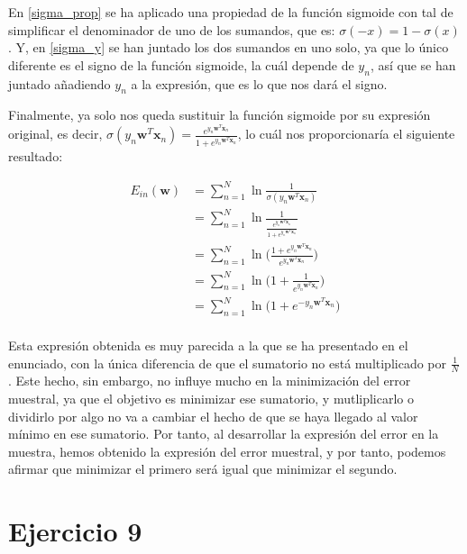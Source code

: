 \documentclass[11pt,a4paper]{article}
\begin{document}
En \eqref{sigma_prop} se ha aplicado una propiedad de la función sigmoide con tal de simplificar el denominador de uno de
los sumandos, que es: $\sigma (-x) = 1 - \sigma (x)$. Y, en \eqref{sigma_y} se han juntado los dos sumandos en uno solo, ya
que lo único diferente es el signo de la función sigmoide, la cuál depende de $y_n$, así que se han juntado añadiendo $y_n$
a la expresión, que es lo que nos dará el signo.

Finalmente, ya solo nos queda sustituir la función sigmoide por su expresión original, es decir,
$\sigma (y_n \mathbf{w}^T\mathbf{x}_n) = \frac{e^{y_n \mathbf{w}^T\mathbf{x}_n}}{1 + e^{y_n \mathbf{w}^T\mathbf{x}_n}}$, lo
cuál nos proporcionaría el siguiente resultado:

\begin{equation}
\begin{split}
	E_{in}(\mathbf{w}) &= \sum_{n=1}^N \ln \frac{1}{\sigma (y_n \mathbf{w}^T\mathbf{x}_n)} \\
	&= \sum_{n=1}^N \ln \frac{1}{\frac{e^{y_n \mathbf{w}^T\mathbf{x}_n}}{1 + e^{y_n \mathbf{w}^T\mathbf{x}_n}}} \\
	&= \sum_{n=1}^N \ln \bigg( \frac{1 + e^{y_n \mathbf{w}^T\mathbf{x}_n}}{e^{y_n \mathbf{w}^T\mathbf{x}_n}} \bigg) \\
	&= \sum_{n=1}^N \ln \bigg(1 + \frac{1}{e^{y_n \mathbf{w}^T\mathbf{x}_n}} \bigg) \\
	&= \sum_{n=1}^N \ln \Big(1 + e^{-y_n \mathbf{w}^T\mathbf{x}_n} \Big) \\
\end{split}
\end{equation}

Esta expresión obtenida es muy parecida a la que se ha presentado en el enunciado, con la única diferencia de que el sumatorio
no está multiplicado por $\frac{1}{N}$. Este hecho, sin embargo, no influye mucho en la minimización del error muestral,
ya que el objetivo es minimizar ese sumatorio, y mutliplicarlo o dividirlo por algo no va a cambiar el hecho de que
se haya llegado al valor mínimo en ese sumatorio. Por tanto, al desarrollar la expresión del error en la muestra, hemos
obtenido la expresión del error muestral, y por tanto, podemos afirmar que minimizar el primero será igual que minimizar el
segundo.

\section*{Ejercicio 9}
\end{document}

